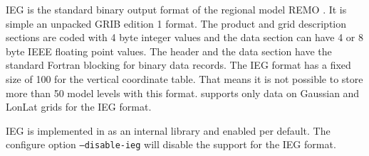 IEG is the standard binary output format of the regional model REMO \cite{REMO}.
It is simple an unpacked GRIB edition 1 format. The product and grid
description sections are coded with 4 byte integer values and the
data section can have 4 or 8 byte IEEE floating point values.
The header and the data section have the standard Fortran blocking
for binary data records. The IEG format has a fixed size of 100 for the
vertical coordinate table. That means it is not possible to store more
than 50 model levels with this format.
{\CDI} supports only data on Gaussian and LonLat grids for the IEG format.

IEG is implemented in {\CDI} as an internal library and enabled per default.
The configure option {\tt --disable-ieg} will disable the support for the IEG format.

